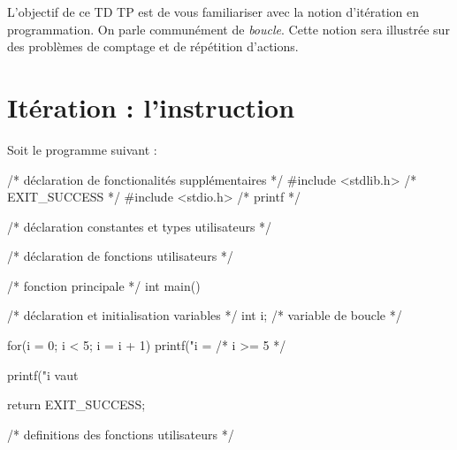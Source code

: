 
\newcommand{\commentaire}[1]{}


L'objectif de ce TD TP est de vous familiariser avec la notion
d'itération en programmation. On parle communément de
\emph{boucle}. Cette notion sera illustrée sur des problèmes de comptage
et de répétition d'actions. 


\section{Itération : l'instruction }


Soit le programme suivant :
{\small
\begin{listing}{1}
/* déclaration de fonctionalités supplémentaires */
#include <stdlib.h> /* EXIT_SUCCESS */
#include <stdio.h> /* printf */

/* déclaration constantes et types utilisateurs */

/* déclaration de fonctions utilisateurs */

/* fonction principale */
int main()
{
    /* déclaration et initialisation variables */
    int i; /* variable de boucle */

    for(i = 0; i < 5; i = i + 1)
    {
        printf("i = %
    }
    /* i >= 5 */

    printf("i vaut %

    return EXIT_SUCCESS;
}

/* definitions des fonctions utilisateurs */
\end{listing}
}

